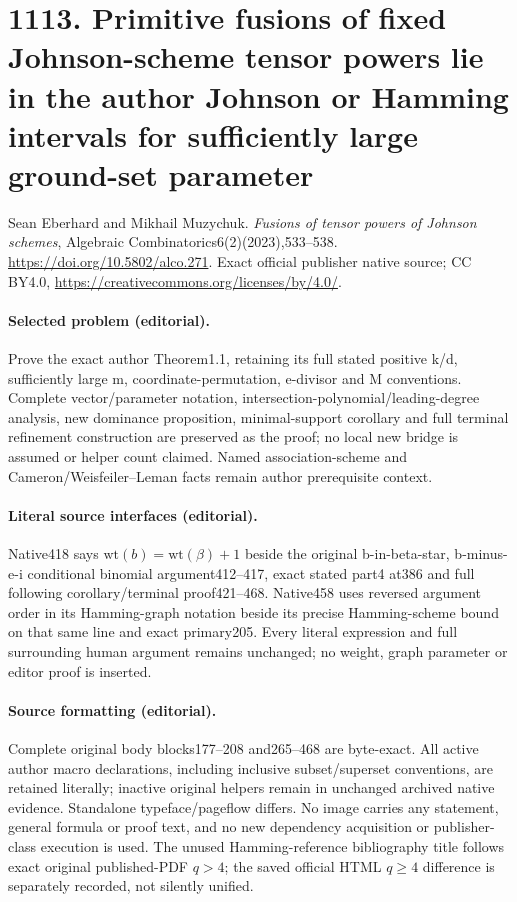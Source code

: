 \documentclass[10pt]{article}
\begin{document}
\section*{1113. Primitive fusions of fixed Johnson-scheme tensor powers lie in the author Johnson or Hamming intervals for sufficiently large ground-set parameter}
Sean Eberhard and Mikhail Muzychuk. \emph{Fusions of tensor powers of Johnson schemes}, Algebraic Combinatorics6(2)(2023),533--538. \url{https://doi.org/10.5802/alco.271}. Exact official publisher native source; CC BY4.0, \url{https://creativecommons.org/licenses/by/4.0/}.\par
\paragraph{Selected problem (editorial).} Prove the exact author Theorem1.1, retaining its full stated positive k/d, sufficiently large m, coordinate-permutation, e-divisor and M conventions. Complete vector/parameter notation, intersection-polynomial/leading-degree analysis, new dominance proposition, minimal-support corollary and full terminal refinement construction are preserved as the proof; no local new bridge is assumed or helper count claimed. Named association-scheme and Cameron/Weisfeiler--Leman facts remain author prerequisite context.
\paragraph{Literal source interfaces (editorial).} Native418 says \(\mathrm{wt}(b)=\mathrm{wt}(\beta)+1\) beside the original b-in-beta-star, b-minus-e-i conditional binomial argument412--417, exact stated part4 at386 and full following corollary/terminal proof421--468. Native458 uses reversed argument order in its Hamming-graph notation beside its precise Hamming-scheme bound on that same line and exact primary205. Every literal expression and full surrounding human argument remains unchanged; no weight, graph parameter or editor proof is inserted.
\paragraph{Source formatting (editorial).} Complete original body blocks177--208 and265--468 are byte-exact. All active author macro declarations, including inclusive subset/superset conventions, are retained literally; inactive original helpers remain in unchanged archived native evidence. Standalone typeface/pageflow differs. No image carries any statement, general formula or proof text, and no new dependency acquisition or publisher-class execution is used. The unused Hamming-reference bibliography title follows exact original published-PDF \(q>4\); the saved official HTML \(q\geq4\) difference is separately recorded, not silently unified.
\clearpage
\end{document}
